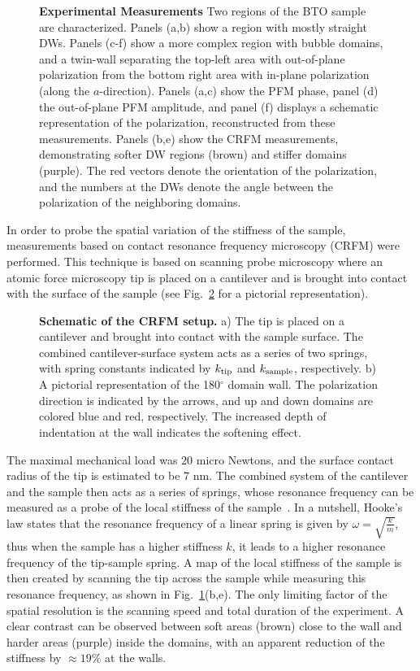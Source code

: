\begin{figure}
	\caption{\label{fig:BTO_experiment} {\bf Experimental Measurements} Two regions of the BTO sample are characterized. Panels (a,b) show a region with mostly straight DWs. Panels (c-f) show a more complex region with bubble domains, and a twin-wall separating the top-left area with out-of-plane polarization from the bottom right area with in-plane polarization (along the $a$-direction). Panels (a,c) show the PFM phase, panel (d) the out-of-plane PFM amplitude, and panel (f) displays a schematic representation of the polarization, reconstructed from these measurements. Panels (b,e) show the CRFM measurements, demonstrating softer DW regions (brown) and stiffer domains (purple). The red vectors denote the orientation of the polarization, and the numbers at the DWs denote the angle between the polarization of the neighboring domains.}
\end{figure}

In order to probe the spatial variation of the stiffness of the sample, measurements based on contact resonance frequency microscopy (CRFM) were performed.
This technique is based on scanning probe microscopy where an atomic force microscopy tip is placed on a cantilever and is brought into contact with the surface of the sample (see Fig.~\ref{fig:BTO_experimental_schematic} for a pictorial representation).
\begin{figure}
	\caption{\label{fig:BTO_experimental_schematic} {\bf Schematic of the CRFM setup.} a) The tip is placed on a cantilever and brought into contact with the sample surface. The combined cantilever-surface system acts as a series of two springs, with spring constants indicated by $k_{\rm tip}$ and $k_{\rm sample}$, respectively. b) A pictorial representation of the 180$^\circ$ domain wall. The polarization direction is indicated by the arrows, and up and down domains are colored blue and red, respectively. The increased depth of indentation at the wall indicates the softening effect.}
\end{figure}
The maximal mechanical load was 20 micro Newtons, and the surface contact radius of the tip is estimated to be 7 nm.
The combined system of the cantilever and the sample then acts as a series of springs, whose resonance frequency can be measured as a probe of the local stiffness of the sample~\cite{Rabe2000}.
In a nutshell, Hooke's law states that the resonance frequency of a linear spring is given by $\omega = \sqrt{\frac{k}{m}}$, thus when the sample has a higher stiffness $k$, it leads to a higher resonance frequency of the tip-sample spring.
A map of the local stiffness of the sample is then created by scanning the tip across the sample while measuring this resonance frequency, as shown in Fig.~\ref{fig:BTO_experiment}(b,e).
The only limiting factor of the spatial resolution is the scanning speed and total duration of the experiment.  
A clear contrast can be observed between soft areas (brown) close to the wall and harder areas (purple) inside the domains, with an apparent reduction of the stiffness by $\approx 19\%$ at the walls.

